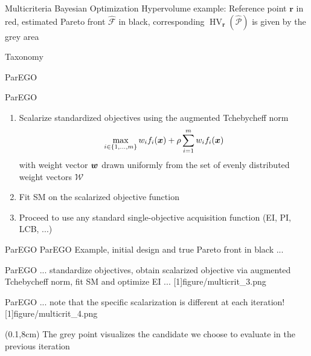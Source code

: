 \documentclass[11pt,compress,t,notes=noshow, xcolor=table]{beamer}
\begin{document}
\begin{framev}{Multicriteria Bayesian Optimization}
Hypervolume example:
\vfill
{}
Reference point $\bm{r}$ in red, estimated Pareto front $\hat{\mathcal{F}}$ in black, corresponding $\operatorname{HV}_{\bm{r}}(\hat{\mathcal{P}})$ is given by the grey area
\end{framev}


\begin{framev}{Taxonomy}
\vfill
\center {}
\end{framev}

\begin{framev}{ParEGO}
\end{framev}


\begin{framev}{ParEGO}
\begin{enumerate}
\item Scalarize standardized objectives using the augmented Tchebycheff norm
$$
\max\limits_{i \in \{1, \ldots, m\}} w_i f_i(\bm{x}) + \rho \sum\limits_{i = 1}^m w_i f_i(\bm{x})
$$
with weight vector $\bm{w}$ drawn uniformly from the set of evenly distributed weight vectors $\mathcal{W}$
\item Fit SM on the scalarized objective function
\item Proceed to use any standard single-objective acquisition function (EI, PI, LCB, ...)
\end{enumerate}
\end{framev}


\begin{framev}{ParEGO}
ParEGO Example, initial design and true Pareto front in black ...
\vfill
{}
\end{framev}


\begin{framev}[align=top]{ParEGO}
... standardize objectives, obtain scalarized objective via augmented Tchebycheff norm, fit SM and optimize EI ...
\imageFixed{1cm}{2.5cm}[1]{figure/multicrit_3.png}
\end{framev}


\begin{framev}[align=top]{ParEGO}
... note that the specific scalarization is different at each iteration!
\imageFixed{1cm}{2.5cm}[1]{figure/multicrit_4.png}
\begin{textblock*}{\linewidth}(0.1\linewidth,8cm)
The grey point visualizes the candidate we choose to evaluate in the previous iteration
\end{textblock*}
\end{framev}
\end{document}

